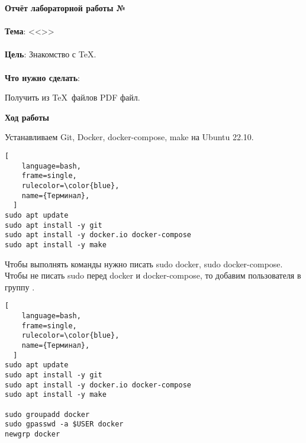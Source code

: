 \documentclass[12pt, a4paper, simple]{eskdtext}
\begin{document}
  


  \begin{center}
    \textbf{Отчёт лабораторной работы №\envReportLabNumber}
  \end{center}


  \paragraph{} \textbf{Тема}: <<\envReportTitle>>


  \paragraph{} \textbf{Цель}:
  Знакомство с \TeX.


  \paragraph{} \textbf{Что нужно сделать}:

  Получить из \TeX~файлов PDF файл.


  \begin{center}
    \textbf{Ход работы}
  \end{center}


  Устанавливаем Git, Docker, docker-compose, make на Ubuntu 22.10.

  \begin{lstlisting}[
    language=bash,
    frame=single,
    rulecolor=\color{blue},
    name={Терминал},
  ]
sudo apt update
sudo apt install -y git
sudo apt install -y docker.io docker-compose
sudo apt install -y make
\end{lstlisting}

  Чтобы выполнять команды нужно писать sudo docker, sudo docker-compose.
  Чтобы не писать sudo перед docker и docker-compose, то добавим пользователя в группу \cite{docker-without-sudo}.

  \begin{lstlisting}[
    language=bash,
    frame=single,
    rulecolor=\color{blue},
    name={Терминал},
  ]
sudo apt update
sudo apt install -y git
sudo apt install -y docker.io docker-compose
sudo apt install -y make

sudo groupadd docker
sudo gpasswd -a $USER docker 
newgrp docker
\end{lstlisting}
\end{document}
